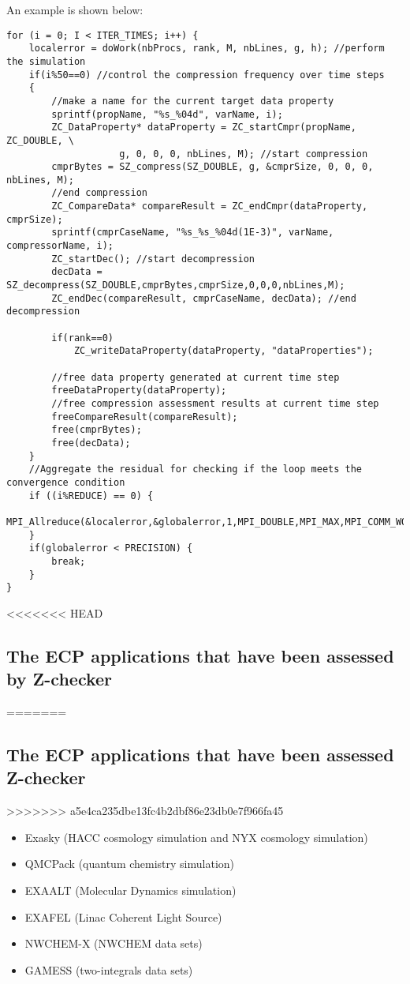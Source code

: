 An example is shown below:
\begin{lstlisting}[style=CStyle, basicstyle = \footnotesize\ttfamily]
for (i = 0; I < ITER_TIMES; i++) {
    localerror = doWork(nbProcs, rank, M, nbLines, g, h); //perform the simulation
    if(i%50==0) //control the compression frequency over time steps
    {
        //make a name for the current target data property
    	sprintf(propName, "%s_%04d", varName, i); 
    	ZC_DataProperty* dataProperty = ZC_startCmpr(propName, ZC_DOUBLE, \
                    g, 0, 0, 0, nbLines, M); //start compression
    	cmprBytes = SZ_compress(SZ_DOUBLE, g, &cmprSize, 0, 0, 0, nbLines, M);
        //end compression
    	ZC_CompareData* compareResult = ZC_endCmpr(dataProperty, cmprSize); 
    	sprintf(cmprCaseName, "%s_%s_%04d(1E-3)", varName, compressorName, i);
    	ZC_startDec(); //start decompression
    	decData = SZ_decompress(SZ_DOUBLE,cmprBytes,cmprSize,0,0,0,nbLines,M);	
    	ZC_endDec(compareResult, cmprCaseName, decData); //end decompression			

    	if(rank==0)
    		ZC_writeDataProperty(dataProperty, "dataProperties");
    	
        //free data property generated at current time step		
    	freeDataProperty(dataProperty); 
        //free compression assessment results at current time step
    	freeCompareResult(compareResult); 
    	free(cmprBytes);
    	free(decData);
    }
    //Aggregate the residual for checking if the loop meets the convergence condition
    if ((i%REDUCE) == 0) {
    	MPI_Allreduce(&localerror,&globalerror,1,MPI_DOUBLE,MPI_MAX,MPI_COMM_WORLD);
    }
    if(globalerror < PRECISION) {
    	break;
    }
}

\end{lstlisting}

<<<<<<< HEAD
\subsection{The ECP applications that have been assessed by Z-checker}
=======
\subsection{The ECP applications that have been assessed Z-checker}
>>>>>>> a5e4ca235dbe13fc4b2dbf86e23db0e7f966fa45

\begin{itemize}
  \item Exasky (HACC cosmology simulation and NYX cosmology simulation)
  \item QMCPack (quantum chemistry simulation)
  \item EXAALT (Molecular Dynamics simulation)
  \item EXAFEL (Linac Coherent Light Source)
  \item NWCHEM-X (NWCHEM data sets)
  \item GAMESS (two-integrals data sets)
\end{itemize}

